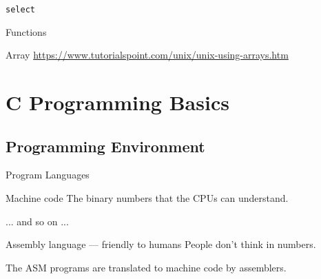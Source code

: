 \begin{frame}{\texttt{select}}
  \begin{center}
  \end{center}
\end{frame}

\begin{frame}{Functions}
  \begin{center}
  \end{center}
\end{frame}

\begin{frame}{Array}
  \url{https://www.tutorialspoint.com/unix/unix-using-arrays.htm}
  
\end{frame}

\section{C Programming Basics}
\label{sec:c-programming-basics}

\subsection{Programming Environment}
\label{sec:progr-envir}

\begin{frame}{Program Languages}
  \begin{block}{Machine code}
    The \alert{binary numbers} that the CPUs can understand.
    \begin{center}{ ... and so on ...}
    \end{center}
  \end{block}
  \begin{block}{Assembly language --- friendly to humans}
    People don't think in numbers.
    \begin{center}
    \end{center}
    The ASM programs are translated to machine code by \alert{assemblers}.
  \end{block}
\end{frame}


